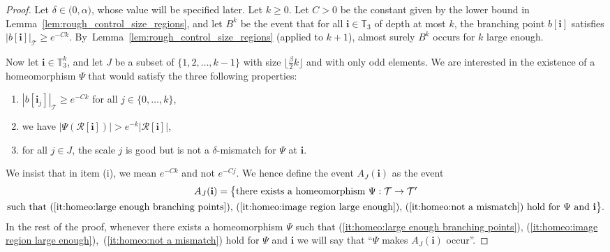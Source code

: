 \documentclass[JEP,XML,SOM,Unicode,NoFloatCountersInSection,published]{cedram}
\newenvironment{enumeratei}
{\bgroup\def\theenumi{\roman{enumi}}\def\theenumii{\arabic{enumii}}\begin{enumerate}}
{\end{enumerate}\egroup}
\newcommand{\intervalle}[4]{\mathopen{#1}#2\mathclose{}\mathpunct{},#3\mathclose{#4}}
\newcommand{\intervalleoo}[2]{\intervalle{(}{#1}{#2}{)}}
\newcommand{\Tt}{\mathcal{T}}
\newcommand{\Rr}{\mathcal{R}}
\newcommand{\ii}{\mathbf{i}}
\theoremstyle{plain}
\theoremstyle{definition}
\begin{document}
\begin{proof}
Let $\delta \in \intervalleoo{0}{\alpha}$, whose value will be specified later.
Let $k \geq 0$.
Let $C>0$ be the constant given by the lower bound in Lemma~\ref{lem:rough_control_size_regions}, and let $B^k$ be the event that for all $\ii \in \mathbb{T}_3$ of depth at most $k$, the branching point $b[\ii]$ satisfies $\left| b[\ii] \right|_{\Tt} \geq e^{-Ck}$.
By~Lemma~\ref{lem:rough_control_size_regions} (applied to $k+1$), almost surely $B^k$ occurs for $k$ large enough.

Now let $\ii \in \mathbb{T}_3^k$, and let $J$ be a subset of $\{ 1,2,\dots, k-1\}$ with size $\lfloor \frac{\beta}{2} k \rfloor$ and with only odd elements.
We are interested in the existence of a homeomorphism $\Psi$ that would satisfy the three following properties:
\begin{enumeratei}
\item\label{it:homeo:large enough branching points} $| b[\ii_j]|_{\Tt} \geq e^{-C k}$ for all $j\in\{0,\dots,k\}$,
\item\label{it:homeo:image region large enough} we have $\left| \Psi \left( \Rr[\ii] \right) \right| > e^{-k} \left| \Rr[\ii] \right|$,
\item\label{it:homeo:not a mismatch} for all $j \in J$, the scale $j$ is good but is not a $\delta$-mismatch for $\Psi$ at $\ii$.
\end{enumeratei}
We insist that in item (i), we mean $e^{-Ck}$ and not $e^{-Cj}$. We hence define the event $A_J(\ii)$ as the event
\begin{multline*}
A_J(\ii) = \big\{ \mbox{there exists a homeomorphism $\Psi:\mathcal{T} \to \mathcal{T}'$} \\ \mbox{such that (\ref{it:homeo:large enough branching points}), (\ref{it:homeo:image region large enough}), (\ref{it:homeo:not a mismatch}) hold for $\Psi$ and $\ii$}\big\}.
\end{multline*}
In the rest of the proof, whenever there exists a homeomorphism $\Psi$ such that (\ref{it:homeo:large enough branching points}), (\ref{it:homeo:image region large enough}),~(\ref{it:homeo:not a mismatch}) hold for $\Psi$ and $\ii$ we will say that ``$\Psi$ makes $A_J(\ii)$ occur''.


\end{proof}
\end{document}
